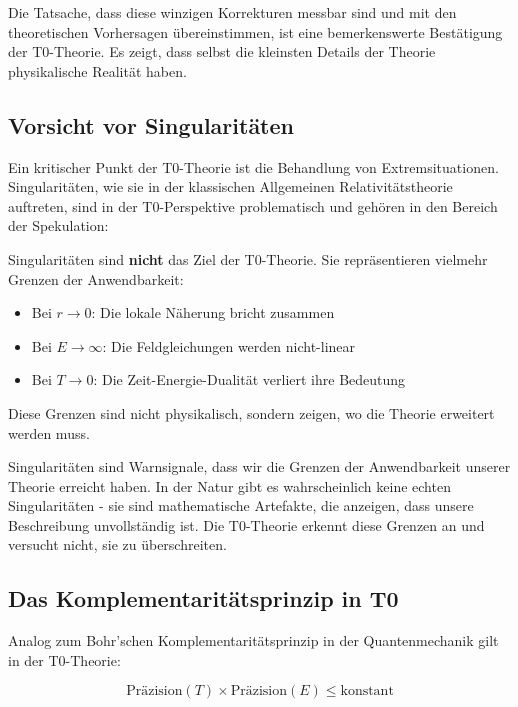 	Die Tatsache, dass diese winzigen Korrekturen messbar sind und mit den theoretischen Vorhersagen übereinstimmen, ist eine bemerkenswerte Bestätigung der T0-Theorie. Es zeigt, dass selbst die kleinsten Details der Theorie physikalische Realität haben.
	
	\subsection{Vorsicht vor Singularitäten}
	
	Ein kritischer Punkt der T0-Theorie ist die Behandlung von Extremsituationen. Singularitäten, wie sie in der klassischen Allgemeinen Relativitätstheorie auftreten, sind in der T0-Perspektive problematisch und gehören in den Bereich der Spekulation:
	
	\begin{tcolorbox}[colback=t0yellow!10!white, colframe=t0yellow!75!black, title=Wichtige Einsicht]
		Singularitäten sind \textbf{nicht} das Ziel der T0-Theorie. Sie repräsentieren vielmehr Grenzen der Anwendbarkeit:
		\begin{itemize}
			\item Bei $r \to 0$: Die lokale Näherung bricht zusammen
			\item Bei $E \to \infty$: Die Feldgleichungen werden nicht-linear
			\item Bei $T \to 0$: Die Zeit-Energie-Dualität verliert ihre Bedeutung
		\end{itemize}
		Diese Grenzen sind nicht physikalisch, sondern zeigen, wo die Theorie erweitert werden muss.
	\end{tcolorbox}
	
	Singularitäten sind Warnsignale, dass wir die Grenzen der Anwendbarkeit unserer Theorie erreicht haben. In der Natur gibt es wahrscheinlich keine echten Singularitäten - sie sind mathematische Artefakte, die anzeigen, dass unsere Beschreibung unvollständig ist. Die T0-Theorie erkennt diese Grenzen an und versucht nicht, sie zu überschreiten.
	
	\subsection{Das Komplementaritätsprinzip in T0}
	
	Analog zum Bohr'schen Komplementaritätsprinzip in der Quantenmechanik gilt in der T0-Theorie:
	
	\begin{equation}
		\text{Präzision}(T) \times \text{Präzision}(E) \leq \text{konstant}
	\end{equation}
	

